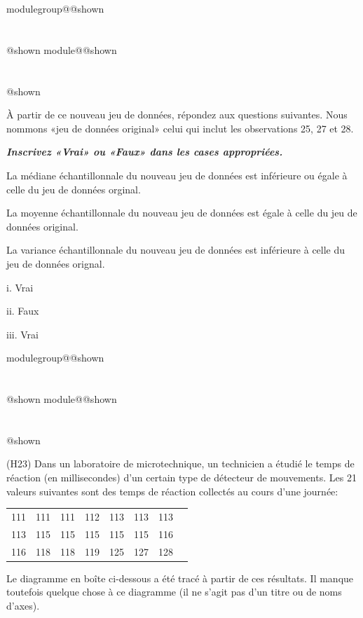 \documentclass{Evaluation}
\makeatletter
\newcommand{\currentmodulekey}{}
\newcommand{\currentmoduletitle}{}
\newcommand{\currentgroupkey}{}
\newcommand{\currentgrouptitle}{}
\newcommand{\showmoduleifneeded}{%
  \ifx\currentgroupkey\empty\else
    \expandafter\ifx\csname modulegroup@\currentgroupkey @shown\endcsname\relax
      \section*{\currentgrouptitle}%
      \expandafter\gdef\csname modulegroup@\currentgroupkey @shown\endcsname{1}%
    \fi
  \fi
  \expandafter\ifx\csname module@\currentmodulekey @shown\endcsname\relax
    \section*{\currentmoduletitle}%
    \expandafter\gdef\csname module@\currentmodulekey @shown\endcsname{1}%
  \fi
}
\newenvironment{A22}{\showmoduleifneeded}{}
\newenvironment{H23}{\showmoduleifneeded}{}
\makeatother
\begin{document}
\begin{questions}
\begin{A22}
\begin{parts}
À partir de ce nouveau jeu de données, répondez aux questions suivantes. Nous nommons «jeu de données original» celui qui inclut les observations 25, 27 et 28.

\textbf{\textit{Inscrivez «Vrai» ou «Faux» dans les cases appropriées.}}

\begin{subparts}
\subpart[1]La médiane échantillonnale du nouveau jeu de données est inférieure ou égale à celle du jeu de données orginal.

\vfrep{}

\subpart[1] La moyenne échantillonnale du nouveau jeu de données est égale à celle du jeu de données original.

\vfrep{}

\subpart[1] La variance échantillonnale du nouveau jeu de données est inférieure à celle du jeu de données orignal.

\vfrep{}

\begin{solution}
    
    i. Vrai

    ii. Faux

    iii. Vrai
\end{solution}
   

\end{subparts}
\end{parts}

\end{A22}

\begin{H23}
\question
(H23)
Dans un laboratoire de microtechnique, un technicien a étudié le temps de réaction (en millisecondes) d'un certain type de détecteur de mouvements. Les 21 valeurs suivantes sont des temps de réaction collectés au cours d'une journée:

\begin{center}
\begin{tabular}{  c c c c c c c c }
111  &111  &111  &112  &113  &113  &113 \\
113 &115  &115  &115  &115 &115 & 116 \\
116 & 118 & 118 & 119 & 125 &127 & 128\\
\end{tabular}
\end{center}

Le diagramme en boîte ci-dessous a été tracé à partir de ces résultats. Il manque toutefois quelque chose à ce diagramme (il ne s'agit pas d'un titre ou de noms d'axes).


\end{H23}
\end{questions}
\end{document}

